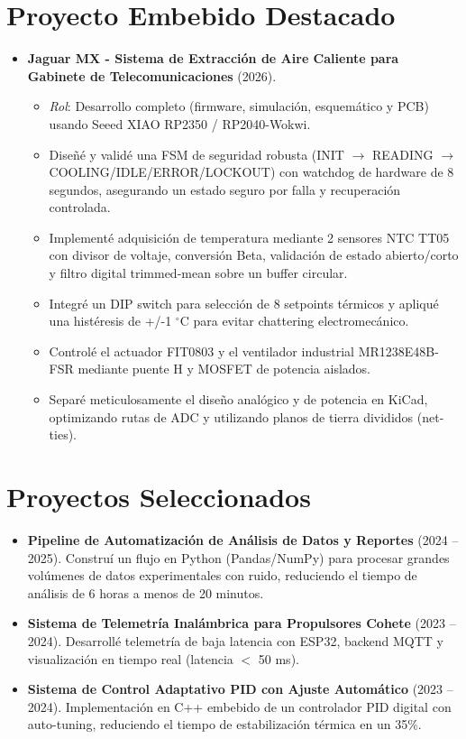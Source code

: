 \documentclass[10pt,letterpaper]{article}
\newcommand{\CVItem}[1]{\item #1}
\begin{document}
\section*{Proyecto Embebido Destacado}
\begin{itemize}[leftmargin=*, itemsep=0pt]
    \item \textbf{Jaguar MX - Sistema de Extracción de Aire Caliente para Gabinete de Telecomunicaciones} (2026).
    \begin{itemize}[itemsep=0pt]
        \item \textit{Rol}: Desarrollo completo (firmware, simulación, esquemático y PCB) usando Seeed XIAO RP2350 / RP2040-Wokwi.
        \item Diseñé y validé una FSM de seguridad robusta (INIT $\rightarrow$ READING $\rightarrow$ COOLING/IDLE/ERROR/LOCKOUT) con watchdog de hardware de 8 segundos, asegurando un estado seguro por falla y recuperación controlada.
        \item Implementé adquisición de temperatura mediante 2 sensores NTC TT05 con divisor de voltaje, conversión Beta, validación de estado abierto/corto y filtro digital trimmed-mean sobre un buffer circular.
        \item Integré un DIP switch para selección de 8 setpoints térmicos y apliqué una histéresis de +/-1 $^\circ$C para evitar chattering electromecánico.
        \item Controlé el actuador FIT0803 y el ventilador industrial MR1238E48B-FSR mediante puente H y MOSFET de potencia aislados.
        \item Separé meticulosamente el diseño analógico y de potencia en KiCad, optimizando rutas de ADC y utilizando planos de tierra divididos (net-ties).
    \end{itemize}
\end{itemize}

\section*{Proyectos Seleccionados}
\begin{itemize}[leftmargin=*, itemsep=0pt]
    \CVItem{\textbf{Pipeline de Automatización de Análisis de Datos y Reportes} (2024 -- 2025). Construí un flujo en Python (Pandas/NumPy) para procesar grandes volúmenes de datos experimentales con ruido, reduciendo el tiempo de análisis de 6 horas a menos de 20 minutos.}
    \CVItem{\textbf{Sistema de Telemetría Inalámbrica para Propulsores Cohete} (2023 -- 2024). Desarrollé telemetría de baja latencia con ESP32, backend MQTT y visualización en tiempo real (latencia $<$ 50 ms).}
    \CVItem{\textbf{Sistema de Control Adaptativo PID con Ajuste Automático} (2023 -- 2024). Implementación en C++ embebido de un controlador PID digital con auto-tuning, reduciendo el tiempo de estabilización térmica en un 35\%.}
\end{itemize}
\end{document}
